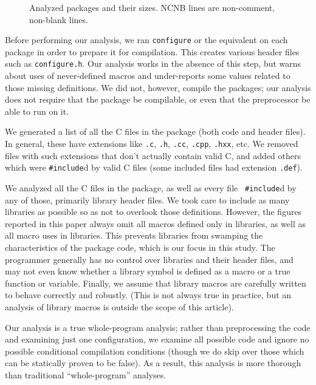 \documentclass[10pt]{article}
\def\typeofdocument{article}
\newcommand{\file}[1]{\texttt{#1}}
\newcommand{\captionsmall}[1]{\caption[]{\small #1}}
\begin{document}
\begin{figure}
\centering
{%
  \small
  \setlength{\tabcolsep}{.25em}
  
}
\captionsmall{Analyzed packages and their sizes.  NCNB lines are non-comment,
  non-blank lines.}
\label{fig:packages}
\end{figure}

Before performing our analysis, we ran {\tt configure} or the equivalent on
each package in order to prepare it for compilation.  This creates various
header files such as \file{configure.h}.  Our analysis works in the
absence of this step, but warns about uses of never-defined macros and
under-reports some values related to those missing definitions.  We did
not, however, compile the packages; our analysis does not require that the
package be compilable, or even that the preprocessor be able to run on it.

We generated a list of all the C files in the package (both code and header
files).  In general, these have extensions like \file{.c}, \file{.h},
\file{.cc}, \file{.cpp}, \file{.hxx}, etc.  We removed files with such
extensions that don't actually contain valid C, and added others which were
{\tt \#include}d by valid C files (some included files had extension
\file{.def}).

We analyzed all the C files in the package, as well as every file {\tt
\#include}d by any of those, primarily library header files.  We
took care to include as many libraries as possible so as not to overlook
those definitions.  However, the figures reported in this paper always omit
all macros defined only in libraries, as well as all macro uses in
libraries.  This prevents libraries from swamping the characteristics of
the package code, which is our focus in this study.  The programmer
generally has no control over libraries and their header files, and may not
even know whether a library symbol is defined as a macro or a true function
or variable.  Finally, we assume that library macros are carefully written
to behave correctly and robustly.  (This is not always true in practice,
but an analysis of library macros is outside the scope of this
\typeofdocument).

Our analysis is a true whole-program analysis; rather than preprocessing the
code and examining just one configuration, we examine all possible code and
ignore no possible  conditional compilation conditions (though we do skip
over those which can be statically proven to be false).   As a result, this
analysis is more thorough than traditional ``whole-program'' analyses.
\end{document}
